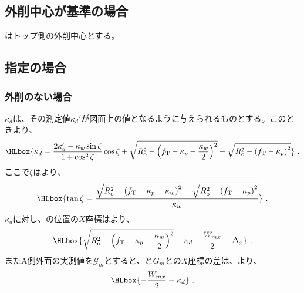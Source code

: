 \subsection{外削中心が基準の場合}
\KeywayCenter はトップ側の外削中心とする。


\subsection{\AsideKeywayDepth 指定の場合}

\subsubsection{外削のない場合}
\AsideKeywayDepth$\kappa_d$は、その測定値$\kappa_d'$が図面上の値となるように与えられるものとする。このときより、
\begin{align*}
  \HLbox{%
    \kappa_d
    = \frac{2\kappa_d'-\kappa_w\sin\zeta}{1+\cos^2\zeta}\cos\zeta
      +\sqrt{R_\mathrm o^2-\left(f_\mathrm T-\kappa_p-\frac{\kappa_w}2\right)^2}
      -\sqrt{R_\mathrm o^2-\left(f_\mathrm T-\kappa_p\right)^2}%
  }\ .
\end{align*}
ここで$\zeta$はより、
\begin{align*}
  \HLbox{%
    \tan\zeta
    = \frac{\sqrt{R_\mathrm o^2-\left(f_\mathrm T-\kappa_p-\kappa_w\right)^2}
            -\sqrt{R_\mathrm o^2-\left(f_\mathrm T-\kappa_p\right)^2}}
           {\kappa_w}%
  }\ .
\end{align*}
\AsideKeywayDepth$\kappa_d$に対し、\KeywayCenter の位置の$X$座標はより、
\begin{align*}
  \HLbox{%
    \sqrt{R_\mathrm o^2-\left(f_\mathrm T-\kappa_p-\frac{\kappa_w}2\right)^2}
    -\kappa_d
    -\frac{W_{mx}}2
    -\Delta_x%
  }\ .
\end{align*}
またA側外面の実測値を$\mathcal G_m$とすると、\KeywayCenter と$G_m$との$X$座標の差は、より、
\begin{align*}
  \HLbox{-\frac{W_{mx}}2-\kappa_d}\ .
\end{align*}

